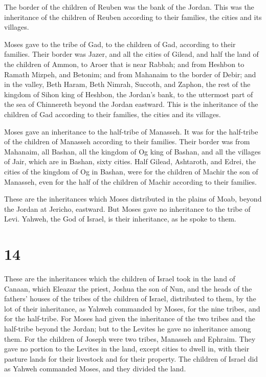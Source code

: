  The border of the children of Reuben was the bank of the
Jordan. This was the inheritance of the children of Reuben according to
their families, the cities and its villages.

 Moses gave to the tribe of Gad, to the children of Gad,
according to their families.  Their border was Jazer, and
all the cities of Gilead, and half the land of the children of Ammon, to
Aroer that is near Rabbah;  and from Heshbon to Ramath
Mizpeh, and Betonim; and from Mahanaim to the border of Debir;
 and in the valley, Beth Haram, Beth Nimrah, Succoth, and
Zaphon, the rest of the kingdom of Sihon king of Heshbon, the Jordan's
bank, to the uttermost part of the sea of Chinnereth beyond the Jordan
eastward.  This is the inheritance of the children of Gad
according to their families, the cities and its villages.

 Moses gave an inheritance to the half-tribe of Manasseh.
It was for the half-tribe of the children of Manasseh according to their
families.  Their border was from Mahanaim, all Bashan,
all the kingdom of Og king of Bashan, and all the villages of Jair,
which are in Bashan, sixty cities.  Half Gilead,
Ashtaroth, and Edrei, the cities of the kingdom of Og in Bashan, were
for the children of Machir the son of Manasseh, even for the half of the
children of Machir according to their families.

 These are the inheritances which Moses distributed in
the plains of Moab, beyond the Jordan at Jericho, eastward.
 But Moses gave no inheritance to the tribe of Levi.
Yahweh, the God of Israel, is their inheritance, as he spoke to them.

\hypertarget{section-13}{%
\section{14}\label{section-13}}

 These are the inheritances which the children of Israel
took in the land of Canaan, which Eleazar the priest, Joshua the son of
Nun, and the heads of the fathers' houses of the tribes of the children
of Israel, distributed to them,  by the lot of their
inheritance, as Yahweh commanded by Moses, for the nine tribes, and for
the half-tribe.  For Moses had given the inheritance of
the two tribes and the half-tribe beyond the Jordan; but to the Levites
he gave no inheritance among them.  For the children of
Joseph were two tribes, Manasseh and Ephraim. They gave no portion to
the Levites in the land, except cities to dwell in, with their pasture
lands for their livestock and for their property.  The
children of Israel did as Yahweh commanded Moses, and they divided the
land.

